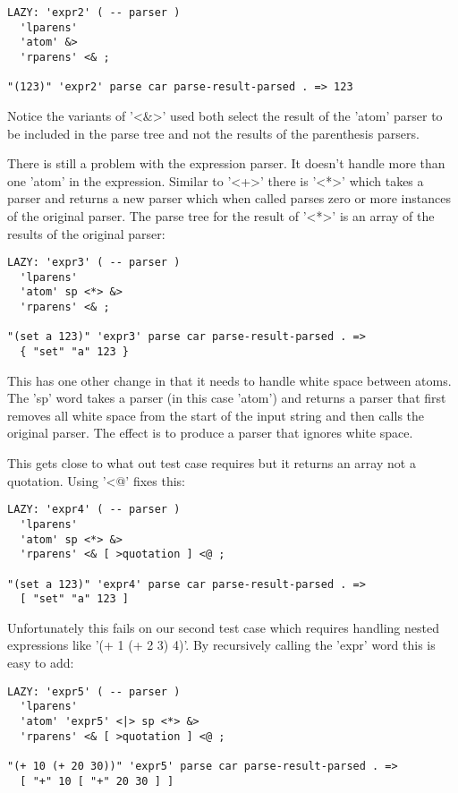 \begin{verbatim}
LAZY: 'expr2' ( -- parser )
  'lparens' 
  'atom' &>
  'rparens' <& ;

"(123)" 'expr2' parse car parse-result-parsed . => 123
\end{verbatim}

Notice the variants of '<\&>' used both select the result of the 'atom'
parser to be included in the parse tree and not the results of the
parenthesis parsers.

There is still a problem with the expression parser. It doesn't handle
more than one 'atom' in the expression. Similar to '<+>' there is
'<*>' which takes a parser and returns a new parser which when called
parses zero or more instances of the original parser. The parse tree
for the result of '<*>' is an array of the results of the original
parser:

\begin{verbatim}
LAZY: 'expr3' ( -- parser )
  'lparens' 
  'atom' sp <*> &>
  'rparens' <& ;

"(set a 123)" 'expr3' parse car parse-result-parsed . => 
  { "set" "a" 123 }
\end{verbatim}

This has one other change in that it needs to handle white space
between atoms. The 'sp' word takes a parser (in this case 'atom') and
returns a parser that first removes all white space from the start of
the input string and then calls the original parser. The effect is to
produce a parser that ignores white space.

This gets close to what out test case requires but it returns an array
 not a quotation. Using '<@' fixes this:

\begin{verbatim}
LAZY: 'expr4' ( -- parser )
  'lparens' 
  'atom' sp <*> &>
  'rparens' <& [ >quotation ] <@ ;

"(set a 123)" 'expr4' parse car parse-result-parsed . => 
  [ "set" "a" 123 ]
\end{verbatim}

Unfortunately this fails on our second test case which requires
handling nested expressions like '(+ 1 (+ 2 3) 4)'. By recursively
calling the 'expr' word this is easy to add:

\begin{verbatim}
LAZY: 'expr5' ( -- parser )
  'lparens' 
  'atom' 'expr5' <|> sp <*> &>
  'rparens' <& [ >quotation ] <@ ;

"(+ 10 (+ 20 30))" 'expr5' parse car parse-result-parsed . => 
  [ "+" 10 [ "+" 20 30 ] ]
\end{verbatim}

